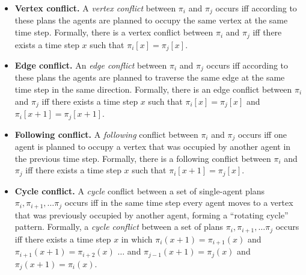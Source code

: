 \documentclass[letterpaper]{article} %
\newcommand{\comment}[1]{{\nb{\textbf{Comment:}}{orange}{#1}}}
\begin{document}
\begin{itemize}
\item \textbf{Vertex conflict.} A \emph{vertex conflict} between $\pi_i$ and $\pi_j$ occurs iff  according to these plans the agents are planned to occupy the same vertex at the same time step.
Formally, there is a vertex conflict between $\pi_i$ and $\pi_j$ iff there exists a time step $x$ such that
$\pi_i[x]=\pi_j[x]$.

\item \textbf{Edge conflict.} An \emph{edge conflict} between $\pi_i$ and $\pi_j$ occurs iff
according to these plans the agents are planned to traverse the same edge at the same time step in the same direction.
Formally, there is an edge conflict between $\pi_i$ and $\pi_j$ iff there exists a time step $x$ such that
$\pi_i[x]=\pi_j[x]$ and $\pi_i[x+1]=\pi_j[x+1]$.



\item \textbf{Following conflict.} A \emph{following} conflict between $\pi_i$ and $\pi_j$ occurs iff
one agent is planned to occupy a vertex that was occupied by another agent in the previous time step.
Formally, there is a following conflict between $\pi_i$ and $\pi_j$ iff there exists a time step $x$ such that
$\pi_i[x+1]=\pi_j[x]$.


\item \textbf{Cycle conflict.} A \emph{cycle} conflict  between a set of single-agent plans $\pi_i, \pi_{i+1}, \ldots \pi_j$ occurs iff
in the same time step every agent moves to a vertex that was previously occupied by another agent, forming a ``rotating cycle'' pattern. Formally, a \emph{cycle conflict} between a set of plans $\pi_i, \pi_{i+1}, \ldots \pi_j$
occurs iff there exists a time step $x$ in which
$\pi_i(x+1)=\pi_{i+1}(x)$
and $\pi_{i+1}(x+1)=\pi_{i+2}(x)$
$\ldots$
and $\pi_{j-1}(x+1)=\pi_j(x)$
and $\pi_j(x+1)=\pi_i(x)$.



\end{itemize}
\end{document}

